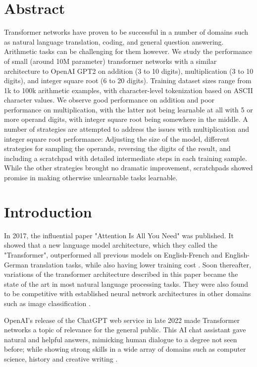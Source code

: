 \thispagestyle{empty}

\section*{Abstract}

Transformer networks have proven to be successful in a number of domains such as natural language translation, coding, and general question answering. Arithmetic tasks can be challenging for them however.
We study the performance of small (around 10M parameter) transformer networks with a similar architecture to OpenAI GPT2 on addition (3 to 10 digits), multiplication (3 to 10 digits), and integer square root (6 to 20 digits). Training dataset sizes range from 1k to 100k arithmetic examples, with character-level tokenization based on ASCII character values.
We observe good performance on addition and poor performance on multiplication, with the latter not being learnable at all with 5 or more operand digits, with integer square root being somewhere in the middle.
A number of strategies are attempted to address the issues with multiplication and integer square root performance: Adjusting the size of the model, different strategies for sampling the operands, reversing the digits of the result, and including a scratchpad with detailed intermediate steps in each training sample.
While the other strategies brought no dramatic improvement, scratchpads showed promise in making otherwise unlearnable tasks learnable.


\clearpage

\tableofcontents
\clearpage

\section{Introduction}

In 2017, the influential paper "Attention Is All You Need" \cite{allyouneed} was published. It showed that a new language model architecture, which they called the "Transformer", outperformed all previous models on English-French and English-German translation tasks, while also having lower training cost . Soon thereafter, variations of the transformer architecture described in this paper became the state of the art in most natural language processing tasks. They were also found to be competitive with established neural network architectures in other domains such as image classification .

OpenAI's release of the ChatGPT web service in late 2022 \cite{openai_chatgpt_2022} made Transformer networks a topic of relevance for the general public. This AI chat assistant gave natural and helpful answers, mimicking human dialogue to a degree not seen before; while showing strong skills in a wide array of domains such as computer science, history and creative writing \cite{Savelka_2023} .

